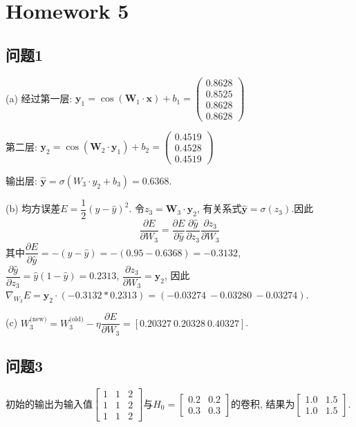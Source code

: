 \section{Homework 5}

\subsection{问题1}

(a) 经过第一层: $\bm y_1=\cos(\bm W_1\cdot \bm x) + b_1=\left(\begin{array}{c}
    0.8628 \\ 0.8525 \\ 0.8628 \\ 0.8628
\end{array}\right)$

第二层: $\bm y_2 = \cos(\bm W_2 \cdot \bm y_1) + b_2=\left(\begin{array}{c}
    0.4519 \\ 0.4528 \\ 0.4519
\end{array}\right)$

输出层: $\bm{\hat y} = \sigma(W_3 \cdot y_2 + b_3)=0.6368$.

(b) 均方误差$E=\dfrac{1}{2}(y-\hat y)^2$. 令$z_3=\bm W_3\cdot \bm y_2$, 有关系式$\bm{\hat y} = \sigma(z_3) $.因此$$\frac{\partial E}{\partial W_3}=\frac{\partial E}{\partial \hat y}
\frac{\partial \hat y}{\partial z_3}\frac{\partial z_3}{\partial W_3}$$
其中$\dfrac{\partial E}{\partial \hat y}=-(y-\hat y)=-(0.95-0.6368)=-0.3132$, $\dfrac{\partial \hat y}{\partial z_3}=\hat y (1-\hat y)
=0.2313$, $\dfrac{\partial z_3}{\partial W_3}=\bm y_2$, 因此$\nabla_{W_3}E=\bm y_2\cdot(-0.3132*0.2313)=(-0.03274\ -0.03280\ -0.03274)$.

(c) $W_3^{\text{(new)}}=W_3^{\text{(old)}}-\eta\dfrac{\partial E}{\partial W_3}=[0.20327\ 0.20328\ 0.40327]$.

\subsection{问题3}

初始的输出为输入值$\left[\begin{array}{ccc}
    1 & 1 & 2 \\ 1 & 1 & 2 \\ 1 & 1 & 2
\end{array}\right]$与$H_0=\left[\begin{array}{cc}
    0.2 & 0.2 \\ 0.3 & 0.3
\end{array}\right]$的卷积, 结果为$\left[\begin{array}{cc}
    1.0 & 1.5 \\ 1.0 & 1.5
\end{array}\right]$.

